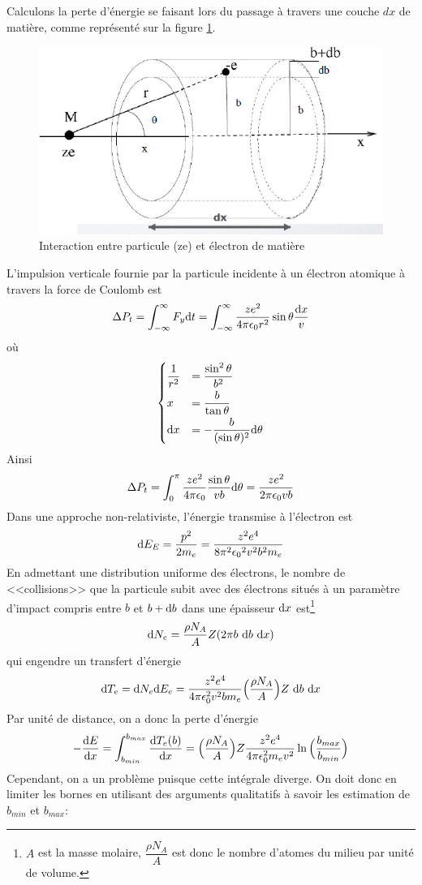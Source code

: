 Calculons la perte d'énergie se faisant lors du passage à travers une couche $dx$ de matière, comme représenté sur la figure \ref{fig:interraction_particule_matiere}. 
\begin{figure}[ht]
    \centering
    \includegraphics[scale=0.60]{Images1/pertenrj.PNG}
    \caption{Interaction entre particule (ze) et électron de matière}
    \label{fig:interraction_particule_matiere}
\end{figure}
L'impulsion verticale fournie par la particule incidente à un électron atomique à travers la force de Coulomb est 
\[
    \Delta P_t=\int_{-\infty}^\infty F_y \mathrm{d}t=\int_{-\infty}^\infty \dfrac{ze^2}{4\pi \epsilon_0 r^2} \sin{\theta}\dfrac{\mathrm{d}x}{v}
\]
où 
\[\begin{cases}
    \dfrac{1}{r^2} &= \dfrac{\sin^2\theta}{b^2} \\[2mm]
    x &= \dfrac{b}{\tan{\theta}} \\[2mm]
    \mathrm{d}x &= -\dfrac{b}{(\sin{\theta})^2}\mathrm{d}\theta
\end{cases}\]
Ainsi
\[
    \Delta P_t=\int_{0}^\pi \dfrac{ze^2}{4\pi \epsilon_0}\dfrac{\sin{\theta}}{vb}\mathrm{d}\theta = \dfrac{ze^2}{2\pi \epsilon_0 vb}
\]
Dans une approche non-relativiste, l'énergie transmise à l'électron est 
\[
    \mathrm{d} E_E=\dfrac{p^2}{2m_e}=\dfrac{z^2e^4}{8\pi^2{\epsilon_0}^2v^2b^2m_e}
\]
En admettant une distribution uniforme des électrons, le nombre de <<collisions>> que la particule subit avec des électrons situés à un paramètre d'impact compris entre $b$ et $b+\mathrm{d} b$ dans une épaisseur $\mathrm{d}x$ est\footnote{$A$ est la masse molaire, $\dfrac{\rho N_A}{A}$ est donc le nombre d'atomes du milieu par unité de volume.}
\[
    \mathrm{d} N_e=\dfrac{\rho N_A}{A}Z(2\pi b~\mathrm{d} b~\mathrm{d}x)
\]
qui engendre un transfert d'énergie 
\[
    \mathrm{d} T_e=\mathrm{d} N_e\mathrm{d} E_e=\dfrac{z^2e^4}{4\pi \epsilon_0^2v^2bm_e}\Big(\dfrac{\rho N_A}{A}\Big)Z~\mathrm{d} b~\mathrm{d}x
\]
Par unité de distance, on a donc la perte d'énergie
\[
    -\dfrac{\mathrm{d} E}{\mathrm{d}x}=\int_{b_{min}}^{b_{max}} \dfrac{\mathrm{d} T_e(b)}{\mathrm{d}x}=\Big(\dfrac{\rho N_A}{A}\Big)Z\dfrac{z^2e^4}{4\pi \epsilon_0^2m_ev^2}\ln{\Big(\dfrac{b_{max}}{b_{min}}\Big)}
\]
Cependant, on a un problème puisque cette intégrale diverge. On doit donc en limiter les bornes en utilisant des arguments qualitatifs à savoir les estimation de $b_{min}$ et $b_{max}$:

